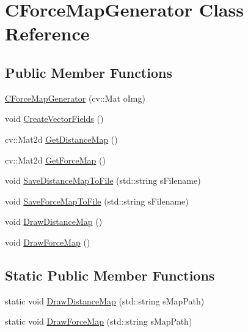 \hypertarget{classCForceMapGenerator}{}\section{C\+Force\+Map\+Generator Class Reference}
\label{classCForceMapGenerator}
\subsection*{Public Member Functions}
\begin{DoxyCompactItemize}
\item 
\hyperlink{classCForceMapGenerator_a9ac30f44691e71c6ce65f4eabbb03801}{C\+Force\+Map\+Generator} (cv\+::\+Mat o\+Img)
\item 
void \hyperlink{classCForceMapGenerator_a8c3c6ab352e4ddb604dd33befc9b9147}{Create\+Vector\+Fields} ()
\item 
cv\+::\+Mat2d \hyperlink{classCForceMapGenerator_afdd89858af3158b17170960df126a7df}{Get\+Distance\+Map} ()
\item 
cv\+::\+Mat2d \hyperlink{classCForceMapGenerator_aee9ad3b402d9275ea734876a8922d616}{Get\+Force\+Map} ()
\item 
void \hyperlink{classCForceMapGenerator_ad6fc008755aff2eb7ce583cef1e46d6d}{Save\+Distance\+Map\+To\+File} (std\+::string s\+Filename)
\item 
void \hyperlink{classCForceMapGenerator_a23f80d23617ecfe5eb3e306293046b53}{Save\+Force\+Map\+To\+File} (std\+::string s\+Filename)
\item 
void \hyperlink{classCForceMapGenerator_a80a8ceee6174a3f0420d70bab79f0129}{Draw\+Distance\+Map} ()
\item 
void \hyperlink{classCForceMapGenerator_a9880307758a447f1e9eded5ccb7d339d}{Draw\+Force\+Map} ()
\end{DoxyCompactItemize}
\subsection*{Static Public Member Functions}
\begin{DoxyCompactItemize}
\item 
static void \hyperlink{classCForceMapGenerator_a09b76abc4d57bd7f10ecd9b4895e3575}{Draw\+Distance\+Map} (std\+::string s\+Map\+Path)
\item 
static void \hyperlink{classCForceMapGenerator_ab05430eb97cf83da00b1116877a37c36}{Draw\+Force\+Map} (std\+::string s\+Map\+Path)
\end{DoxyCompactItemize}


